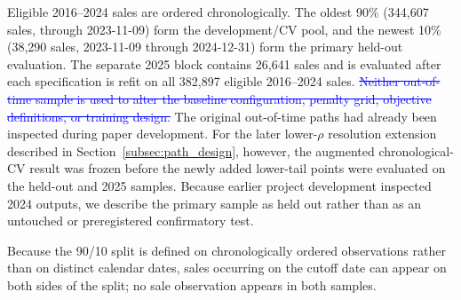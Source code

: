 \documentclass[10pt]{article}
\theoremstyle{definition}
\newcommand{\1}{\mathbf{1}}
\newcommand{\oldtext}[1]{\textcolor{blue}{\sout{#1}}}
\newcommand{\newtext}[1]{\textcolor{impGreen}{#1}}
\newcommand{\latesttext}[1]{\textcolor{latestPurple}{#1}}
\begin{document}
\newtext{Eligible 2016--2024 sales are ordered chronologically. The oldest 90\% (344,607 sales, through 2023-11-09) form the development/CV pool, and the newest 10\% (38,290 sales, 2023-11-09 through 2024-12-31) form the primary held-out evaluation. The separate 2025 block contains 26,641 sales and is evaluated after each specification is refit on all 382,897 eligible 2016--2024 sales.}
\oldtext{Neither out-of-time sample is used to alter the baseline configuration, penalty grid, objective definitions, or training design.}
\latesttext{The original out-of-time paths had already been inspected during paper development. For the later lower-$\rho$ resolution extension described in Section~\ref{subsec:path_design}, however, the augmented chronological-CV result was frozen before the newly added lower-tail points were evaluated on the held-out and 2025 samples.}
\newtext{Because earlier project development inspected 2024 outputs, we describe the primary sample as held out rather than as an untouched or preregistered confirmatory test.}

\newtext{Because the 90/10 split is defined on chronologically ordered observations rather than on distinct calendar dates, sales occurring on the cutoff date can appear on both sides of the split; no sale observation appears in both samples.}
\end{document}
